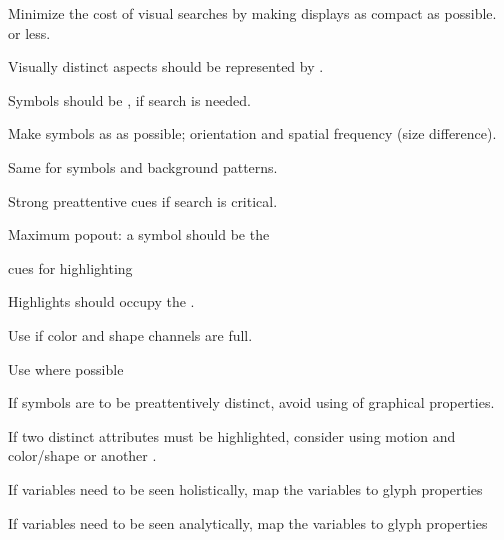 \begin{compactenum}

    \item Minimize the cost of visual searches by making displays as compact
        as possible.  or less.

    \item Visually distinct aspects should be represented by .

    \item Symbols should be , if
        search is needed.

    \item Make symbols as  as possible; orientation and
        spatial frequency (size difference).

    \item Same for symbols and background patterns.

    \item Strong preattentive cues  if search is critical.

    \item Maximum popout: a symbol should be the 

    \item {} cues for highlighting

    \item Highlights should occupy the .

    \item Use  if color and shape channels are full.

    \item Use  where possible

    \item If symbols are to be preattentively distinct, avoid using
         of graphical properties.

    \item If two distinct attributes must be highlighted, consider using
        motion and color/shape or another .

    \item If variables need to be seen holistically, map the variables to
         glyph properties

    \item If variables need to be seen analytically, map the variables to
         glyph properties


\end{compactenum}
